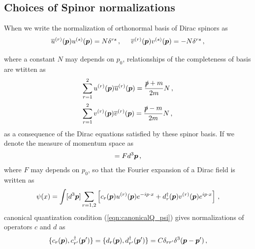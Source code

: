 \subsection{Choices of Spinor normalizations }
When we write the normalization of orthonormal basis of Dirac spinors as
\begin{eqnarray}
\begin{array}{c}
\overline{u}^{(r)}(\bld{p})
u^{(s)}(\bld{p})
= N \delta^{rs}\,,
\hspace{5mm}
\overline{v}^{(r)}(\bld{p})
v^{(s)}(\bld{p})
= -N \delta^{rs}\,,
\vspace{2mm}
\end{array}
\label{eqn:ArbitraryDiracspinorNormalization}
\end{eqnarray}
where a constant $N$ may depends on $p_0$,
relationships of the completeness of basis are wtitten as
\begin{eqnarray}
\begin{array}{l}
\displaystyle
\sum_{r=1}^2 u^{(r)}(\bld{p}) 
\overline{u}^{(r)}(\bld{p})
=
\frac{\slashed{p} + m}{2m}N\,,
\vspace{2mm}
\\
\displaystyle
\sum_{r=1}^2 v^{(r)}(\bld{p}) 
\overline{v}^{(r)}(\bld{p})
=
\frac{\slashed{p} - m}{2m}N\,,
\end{array}
\label{eqn:DiracspinorPolSumforN}
\end{eqnarray}
as a consequence of the Dirac equations satisfied by these spinor basis.
If we denote the measure of momentum space as
\begin{eqnarray}
[ d^3 \bld{p} ] = F d^3 \bld{p}\,,
\end{eqnarray}
where $F$ may depends on $p_0$, so that the Fourier expansion of a Dirac field is written as
\begin{equation}
\psi(x) 
=
\int [ d^3 \mbox{\boldmath $p$} ]
\sum_{r = 1,2}
\left[
c_r(\mbox{\boldmath $p$}) u^{(r)}(\mbox{\boldmath $p$}) e^{-ip \cdot x}
+
d_r^\dagger(\mbox{\boldmath $p$}) v^{(r)}(\mbox{\boldmath $p$}) e^{ip \cdot x}
\right]\,,
\label{eqn:DiracFourierArbMeasure}
\end{equation}
canonical quantization condition (\ref{eqn:canonicalQ_psi}) gives
normalizations of operators $c$ and $d$ as
\begin{equation}
\{ c_{r}(\mbox{\boldmath $p$}), c_{r'}^\dagger(\mbox{\boldmath $p$}') \}
=
\{ d_{r}(\mbox{\boldmath $p$}), d_{r'}^\dagger(\mbox{\boldmath $p$}') \}
=
C \delta_{rr'} 
\delta^3(\mbox{\boldmath $p$} - \mbox{\boldmath $p$}')\,,
\label{eqn:Dirc_creann_with_C}
\end{equation}
